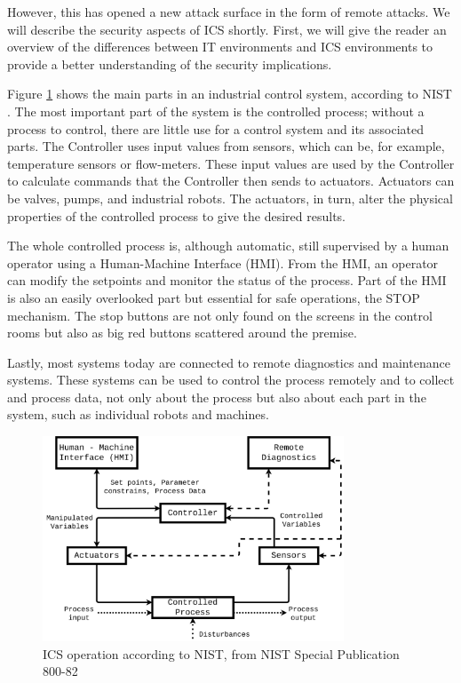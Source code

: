 However, this has opened a new attack surface in the form of remote attacks. We will describe the security aspects of ICS shortly. First, we will give the reader an overview of the differences between IT environments and ICS environments to provide a better understanding of the security implications.


Figure \ref{fig:nist_ics} shows the main parts in an industrial control system, according to NIST \cite{stouffer2011sp}. The most important part of the system is the controlled process; without a process to control, there are little use for a control system and its associated parts. The Controller uses input values from sensors, which can be, for example, temperature sensors or flow-meters. These input values are used by the Controller to calculate commands that the Controller then sends to actuators. Actuators can be valves, pumps, and industrial robots. The actuators, in turn, alter the physical properties of the controlled process to give the desired results. 

The whole controlled process is, although automatic, still supervised by a human operator using a Human-Machine Interface (HMI).
From the HMI, an operator can modify the setpoints and monitor the status of the process. Part of the HMI is also an easily overlooked part but essential for safe operations, the STOP mechanism. The stop buttons are not only found on the screens in the control rooms but also as big red buttons scattered around the premise. 

Lastly, most systems today are connected to remote diagnostics and maintenance systems. These systems can be used to control the process remotely and to collect and process data, not only about the process but also about each part in the system, such as individual robots and machines. 

\begin{figure}[ht]
\centering
\includegraphics[width=0.8\textwidth]{images/NIST_800.png}
\caption{ICS operation according to NIST, from NIST Special Publication 800-82}
\label{fig:nist_ics}
\end{figure}

